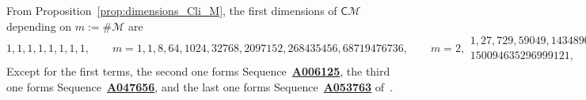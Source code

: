 \documentclass[10pt,reqno]{amsart}
\numberwithin{equation}{subsection}
\newcommand{\Mca}{\mathcal{M}}
\newcommand{\Cli}{\mathsf{C}}
\newcommand{\OEIS}[1]{\href{http://oeis.org/#1}{{\bf #1}}}
\begin{document}
From Proposition~\ref{prop:dimensions_Cli_M}, the first dimensions of
$\Cli\Mca$ depending on $m := \# \Mca$ are
\begin{subequations}
\begin{equation}
    1, 1, 1, 1, 1, 1, 1, 1,
    \qquad m = 1,
\end{equation}
\begin{equation}
    1, 8, 64, 1024, 32768, 2097152, 268435456, 68719476736,
    \qquad m = 2,
\end{equation}
\begin{multline}
    1, 27, 729, 59049, 14348907, 10460353203, 22876792454961, \\
    150094635296999121,
    \qquad m = 3,
\end{multline}
\begin{multline}
    1, 64, 4096, 1048576, 1073741824, 4398046511104, 72057594037927936, \\
    4722366482869645213696,
    \qquad m = 4.
\end{multline}
\end{subequations}
Except for the first terms, the second one forms
Sequence~\OEIS{A006125}, the third one forms Sequence~\OEIS{A047656},
and the last one forms Sequence~\OEIS{A053763} of~\cite{Slo}.
\medskip
\end{document}
